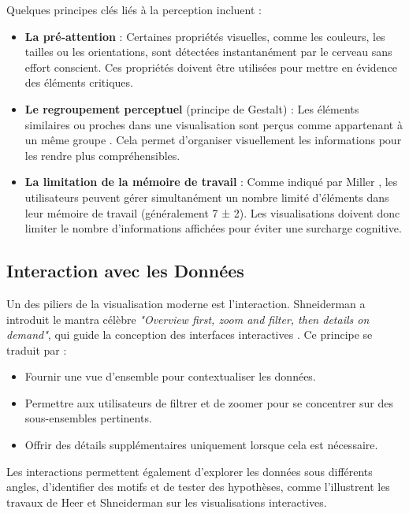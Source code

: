 \documentclass[runningheads]{llncs}
\begin{document}
Quelques principes clés liés à la perception incluent :
\begin{itemize}
    \item \textbf{La pré-attention} : Certaines propriétés visuelles, comme les couleurs, les tailles ou les orientations, sont détectées instantanément par le cerveau sans effort conscient. Ces propriétés doivent être utilisées pour mettre en évidence des éléments critiques.
    \item \textbf{Le regroupement perceptuel} (principe de Gestalt) : Les éléments similaires ou proches dans une visualisation sont perçus comme appartenant à un même groupe \cite{card_readings_1999}. Cela permet d'organiser visuellement les informations pour les rendre plus compréhensibles.
    \item \textbf{La limitation de la mémoire de travail} : Comme indiqué par Miller \cite{miller_magical_1956}, les utilisateurs peuvent gérer simultanément un nombre limité d'éléments dans leur mémoire de travail (généralement 7 ± 2). Les visualisations doivent donc limiter le nombre d'informations affichées pour éviter une surcharge cognitive.
\end{itemize}

\subsection{Interaction avec les Données}
Un des piliers de la visualisation moderne est l'interaction. Shneiderman a introduit le mantra célèbre \textit{"Overview first, zoom and filter, then details on demand"}, qui guide la conception des interfaces interactives \cite{shneiderman_eyes_2003}. Ce principe se traduit par :
\begin{itemize}
    \item Fournir une vue d’ensemble pour contextualiser les données.
    \item Permettre aux utilisateurs de filtrer et de zoomer pour se concentrer sur des sous-ensembles pertinents.
    \item Offrir des détails supplémentaires uniquement lorsque cela est nécessaire.
\end{itemize}

Les interactions permettent également d’explorer les données sous différents angles, d’identifier des motifs et de tester des hypothèses, comme l’illustrent les travaux de Heer et Shneiderman \cite{heer_design_2012} sur les visualisations interactives.
\end{document}
